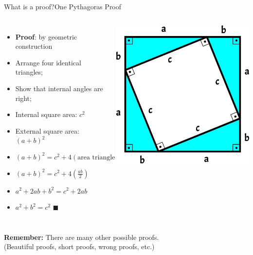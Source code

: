 \begin{frame}{What is a proof?}{One Pythagoras Proof}

  \begin{columns}[T]
      \begin{itemize}
        \item {\bf Proof}: by geometric construction
        \item Arrange four identical triangles;
        \item Show that internal angles are right;
        \item Internal square area: $c^2$
        \item External square area: $(a+b)^2$
        \item $(a+b)^2 = c^2 + 4(\text{area triangle})$
        \item $(a+b)^2 = c^2 + 4(\frac{ab}{2})$
        \item $a^2 + 2ab + b^2 = c^2 + 2ab$
        \item $a^2 + b^2 = c^2$ \hfill $\blacksquare$
      \end{itemize}
      \includegraphics[width=\textwidth]{../img/triangle_pytagoras}
  \end{columns}
  \bigskip

  {\bf Remember:} There are many other possible proofs.\\(Beautiful proofs, short proofs, wrong proofs, etc.)
\end{frame}

